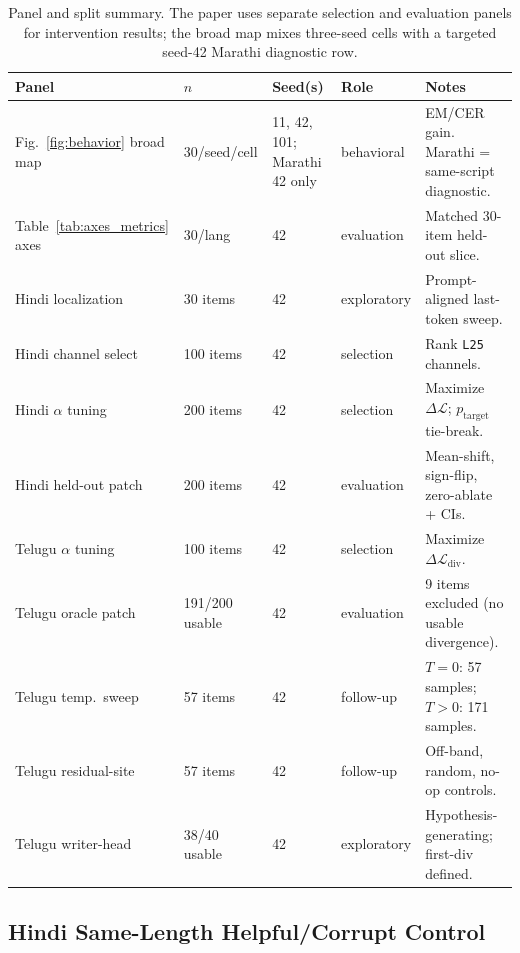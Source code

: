 \documentclass{article}
\begin{document}
\begin{table}[H]
\centering
\scriptsize
\setlength{\tabcolsep}{4pt}
\begin{tabularx}{\textwidth}{p{2.8cm}p{2.0cm}p{1.6cm}p{1.8cm}X}
\toprule
\textbf{Panel} & \textbf{$n$} & \textbf{Seed(s)} & \textbf{Role} & \textbf{Notes} \\
\midrule
Fig.~\ref{fig:behavior} broad map & 30/seed/cell & 11, 42, 101; Marathi 42 only & behavioral & EM/CER gain. Marathi = same-script diagnostic. \\
Table~\ref{tab:axes_metrics} axes & 30/lang & 42 & evaluation & Matched 30-item held-out slice. \\
Hindi localization & 30 items & 42 & exploratory & Prompt-aligned last-token sweep. \\
Hindi channel select & 100 items & 42 & selection & Rank \texttt{L25} channels. \\
Hindi $\alpha$ tuning & 200 items & 42 & selection & Maximize $\Delta\mathcal{L}$; $p_{\mathrm{target}}$ tie-break. \\
Hindi held-out patch & 200 items & 42 & evaluation & Mean-shift, sign-flip, zero-ablate + CIs. \\
Telugu $\alpha$ tuning & 100 items & 42 & selection & Maximize $\Delta\mathcal{L}_{\mathrm{div}}$. \\
Telugu oracle patch & 191/200 usable & 42 & evaluation & 9 items excluded (no usable divergence). \\
Telugu temp.\ sweep & 57 items & 42 & follow-up & $T{=}0$: 57 samples; $T{>}0$: 171 samples. \\
Telugu residual-site & 57 items & 42 & follow-up & Off-band, random, no-op controls. \\
Telugu writer-head & 38/40 usable & 42 & exploratory & Hypothesis-generating; first-div defined. \\
\bottomrule
\end{tabularx}
\caption{Panel and split summary. The paper uses separate selection and evaluation panels for intervention results; the broad map mixes three-seed cells with a targeted seed-42 Marathi diagnostic row.}
\label{tab:panelsummary}
\end{table}

\subsection{Hindi Same-Length Helpful/Corrupt Control}\label{app:hindi_same_length}
\end{document}
